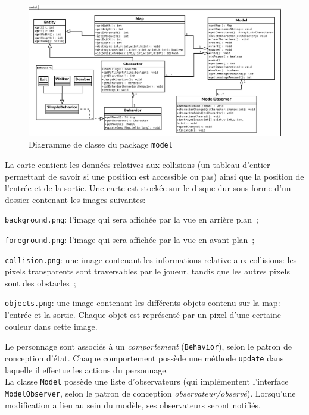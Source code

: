 \documentclass[a4paper,12pt]{article}
\begin{document}
\begin{figure}[ht!]
  \centerline{
  \includegraphics[width=\textwidth]{model.png}}
  \caption{Diagramme de classe du package \texttt{model}}
\end{figure}

La carte contient les données relatives aux collisions (un tableau
d'entier permettant de savoir si une position est accessible ou pas)
ainsi que la position de l'entrée et de la sortie. Une carte est
stockée sur le disque dur sous forme d'un dossier contenant les images
suivantes:
\begin{list}{-}{}
  \item \texttt{background.png}: l'image qui sera affichée par la vue
    en arrière plan~;
  \item \texttt{foreground.png}: l'image qui sera affichée par la vue
    en avant plan~;
  \item \texttt{collision.png}: une image contenant les informations
    relative aux collisions: les pixels transparents sont traversables
    par le joueur, tandis que les autres pixels sont des obstacles~;
  \item \texttt{objects.png}: une image contenant les différents
    objets contenu sur la map: l'entrée et la sortie.  Chaque objet
    est représenté par un pixel d'une certaine couleur dans cette
    image.
\end{list}

Le personnage sont associés à un \emph{comportement}
(\texttt{Behavior}), selon le patron de conception d'état.  Chaque
comportement possède une méthode \texttt{update} dans laquelle il
effectue les actions du personnage.\\

La classe \texttt{Model} possède une liste d'observateurs (qui
implémentent l'interface \texttt{ModelObserver}, selon le patron de
conception \emph{observateur/observé}). Lorsqu'une modification a lieu
au sein du modèle, ses observateurs seront notifiés.\\
\end{document}
